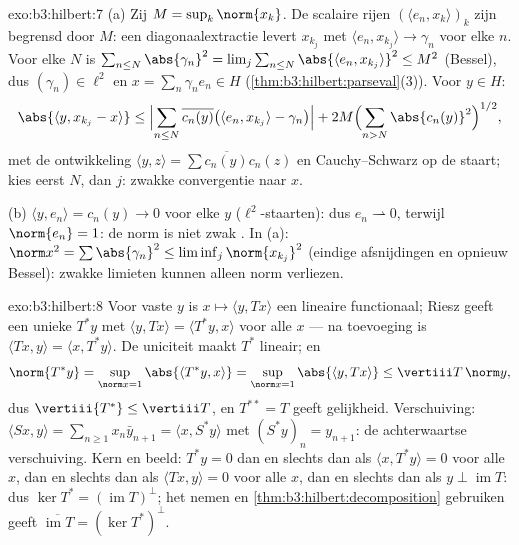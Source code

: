 \begin{solution}{exo:b3:hilbert:7}
(a) Zij $M = \sup_k\norm{x_k}$. De scalaire rijen $(\langle e_n,
x_k\rangle)_k$ zijn begrensd door $M$: een diagonaalextractie
levert $x_{k_j}$ met $\langle e_n, x_{k_j}\rangle \to \gamma_n$
voor elke $n$. Voor elke $N$ is $\sum_{n\leq N}\abs{\gamma_n}^2 =
\lim_j\sum_{n\leq N}\abs{\langle e_n, x_{k_j}\rangle}^2 \leq M^2$
(Bessel), dus $(\gamma_n) \in \ell^2$ en $x = \sum_n\gamma_ne_n
\in H$ (\cref{thm:b3:hilbert:parseval}(3)). Voor $y \in H$:
\[
\abs{\langle y, x_{k_j} - x\rangle}
\leq \Bigl|\sum_{n\leq N}\overline{c_n(y)}\bigl(\langle e_n,
x_{k_j}\rangle - \gamma_n\bigr)\Bigr|
+ 2M\Bigl(\sum_{n>N}\abs{c_n(y)}^2\Bigr)^{1/2},
\]
met de ontwikkeling $\langle y, z\rangle =
\sum\overline{c_n(y)}c_n(z)$ en Cauchy--Schwarz op de staart;
kies eerst $N$, dan $j$: zwakke convergentie naar $x$.

(b) $\langle y, e_n\rangle = c_n(y) \to 0$ voor elke $y$
($\ell^2$-staarten): dus $e_n \rightharpoonup 0$, terwijl
$\norm{e_n} = 1$: de norm is niet zwak . In (a): $\norm
x^2 = \sum\abs{\gamma_n}^2 \leq \liminf_j\norm{x_{k_j}}^2$
(eindige afsnijdingen en opnieuw Bessel): zwakke limieten kunnen
alleen norm verliezen.
\end{solution}

\begin{solution}{exo:b3:hilbert:8}
Voor vaste $y$ is $x \mapsto \langle y, Tx\rangle$ een 
lineaire functionaal; Riesz geeft een unieke $T^*y$ met $\langle
y, Tx\rangle = \langle T^*y, x\rangle$ voor alle $x$ --- na
toevoeging is $\langle Tx, y\rangle = \langle x, T^*y\rangle$. De
uniciteit maakt $T^*$ lineair; en
\[
\norm{T^*y} = \sup_{\norm x = 1}\abs{\langle T^*y, x\rangle}
= \sup_{\norm x=1}\abs{\langle y, Tx\rangle}
\leq \vertiii T\,\norm y,
\]
dus $\vertiii{T^*} \leq \vertiii T$, en $T^{**} = T$ geeft
gelijkheid. Verschuiving: $\langle Sx, y\rangle = \sum_{n\geq1}
x_n\bar y_{n+1} = \langle x, S^*y\rangle$ met $(S^*y)_n =
y_{n+1}$: de achterwaartse verschuiving. Kern en beeld: $T^*y =
0$ dan en slechts dan als $\langle x, T^*y\rangle = 0$ voor alle
$x$, dan en slechts dan als $\langle Tx, y\rangle = 0$ voor alle
$x$, dan en slechts dan als $y \perp \operatorname{im}T$: dus
$\ker T^* = (\operatorname{im}T)^\perp$; het  nemen en \cref{thm:b3:hilbert:decomposition} gebruiken
geeft $\overline{\operatorname{im}T} = (\ker T^*)^\perp$.
\end{solution}

